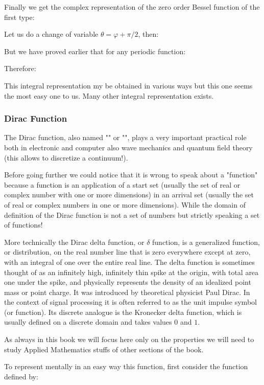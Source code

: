 	Finally we get the complex representation of the zero order Bessel function of the first type:
	
	Let us do a change of variable $\theta=\varphi+\pi/2$, then:
	
	But we have proved earlier that for any periodic function:
	
	Therefore:
	
	This integral representation my be obtained in various ways but this one seems the most easy one to us. Many other integral representation exists.

	\subsubsection{Dirac Function}
	The Dirac function, also named "\label{dirac function}" or "", plays a very important practical role both in electronic and computer also  wave mechanics and quantum field theory (this allows to discretize a continuum!).
	
	Before going further we could notice that it is wrong to speak about a "function" because a function is an application of a start set (usually the set of real or complex number with one or more dimensions) in an arrival set (usually the set of real or complex numbers in one or more dimensions). While the domain of definition of the Dirac function is not a set of numbers but strictly speaking a set of functions!
	
	More technically the Dirac delta function, or $\delta$ function, is a generalized function, or distribution, on the real number line that is zero everywhere except at zero, with an integral of one over the entire real line. The delta function is sometimes thought of as an infinitely high, infinitely thin spike at the origin, with total area one under the spike, and physically represents the density of an idealized point mass or point charge. It was introduced by theoretical physicist Paul Dirac. In the context of signal processing it is often referred to as the unit impulse symbol (or function). Its discrete analogue is the Kronecker delta function, which is usually defined on a discrete domain and takes values $0$ and $1$.
	
	As always in this book we will focus here only on the properties we will need to study Applied Mathematics stuffs of other sections of the book.
	
	To represent mentally in an easy way this function, first consider the function defined by:
	
